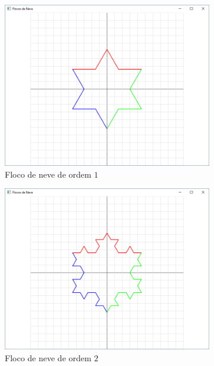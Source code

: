 \begin{enumerate}
\begin{enumerate}
      \begin{figure}[!htp]
          \centering
          \begin{subfigure}[t]{0.4\textwidth}
              \centerline{\includegraphics[width=.9\textwidth]{img/cap4_ex15}}
              \caption{Floco de neve de ordem $1$}
              \label{fig:cap04_ex15a}
          \end{subfigure}
          \hfill
          \begin{subfigure}[t]{0.4\textwidth}
              \centerline{\includegraphics[width=.9\textwidth]{img/cap4_ex15b}}
              \caption{Floco de neve de ordem $2$}
              \label{fig:cap04_ex15b}
          \end{subfigure}
          \hfill
          \begin{subfigure}[t]{0.4\textwidth}

\end{subfigure}
\end{figure}
\end{enumerate}
\end{enumerate}
